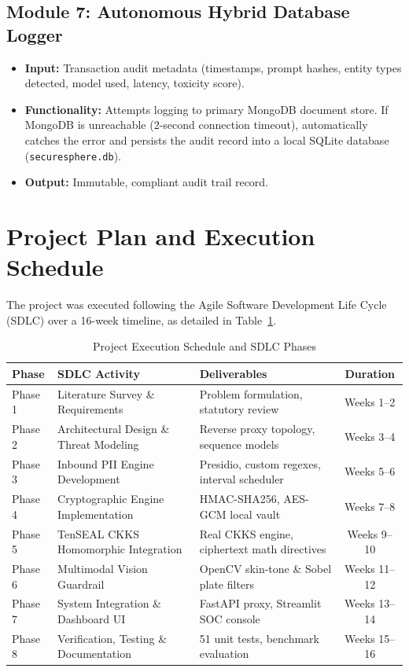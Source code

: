 \subsection{Module 7: Autonomous Hybrid Database Logger}
\begin{itemize}[leftmargin=*]
    \item \textbf{Input:} Transaction audit metadata (timestamps, prompt hashes, entity types detected, model used, latency, toxicity score).
    \item \textbf{Functionality:} Attempts logging to primary MongoDB document store. If MongoDB is unreachable (2-second connection timeout), automatically catches the error and persists the audit record into a local SQLite database (\texttt{securesphere.db}).
    \item \textbf{Output:} Immutable, compliant audit trail record.
\end{itemize}

\section{Project Plan and Execution Schedule}
The project was executed following the Agile Software Development Life Cycle (SDLC) over a 16-week timeline, as detailed in Table~\ref{tab:project_plan}.

\begin{table}[htbp]
\centering
\caption{Project Execution Schedule and SDLC Phases}\label{tab:project_plan}
\begin{tabular}{lllc}
\toprule
\textbf{Phase} & \textbf{SDLC Activity} & \textbf{Deliverables} & \textbf{Duration} \\
\midrule
Phase 1 & Literature Survey \& Requirements & Problem formulation, statutory review & Weeks 1--2 \\
Phase 2 & Architectural Design \& Threat Modeling & Reverse proxy topology, sequence models & Weeks 3--4 \\
Phase 3 & Inbound PII Engine Development & Presidio, custom regexes, interval scheduler & Weeks 5--6 \\
Phase 4 & Cryptographic Engine Implementation & HMAC-SHA256, AES-GCM local vault & Weeks 7--8 \\
Phase 5 & TenSEAL CKKS Homomorphic Integration & Real CKKS engine, ciphertext math directives & Weeks 9--10 \\
Phase 6 & Multimodal Vision Guardrail & OpenCV skin-tone \& Sobel plate filters & Weeks 11--12 \\
Phase 7 & System Integration \& Dashboard UI & FastAPI proxy, Streamlit SOC console & Weeks 13--14 \\
Phase 8 & Verification, Testing \& Documentation & 51 unit tests, benchmark evaluation & Weeks 15--16 \\
\bottomrule
\end{tabular}
\end{table}
